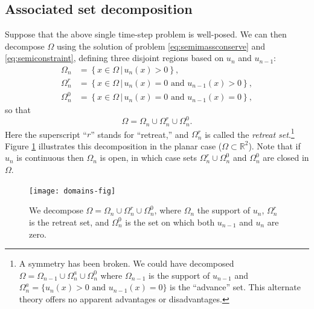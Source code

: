 \documentclass[final,leqno,onefignum,onetabnum]{siamltex1213bueler}
\newcommand\RR{\mathbb{R}}
\begin{document}
\subsection{Associated set decomposition}  \label{subsec:setdecompose}  Suppose that the above single time-step problem is well-posed.  We can then decompose $\Omega$ using the solution of problem \eqref{eq:semimassconserve} and \eqref{eq:semiconstraint}, defining three disjoint regions based on $u_n$ and $u_{n-1}$:
\begin{align*}
\Omega_n &= \left\{x \in \Omega \,\big|\, u_n(x)>0\right\}, \\
\Omega_n^r &= \left\{x \in \Omega \,\big|\, u_n(x)=0 \text{ and } u_{n-1}(x) > 0\right\}, \\
\Omega_n^0 &= \left\{x \in \Omega \,\big|\, u_n(x)=0 \text{ and } u_{n-1}(x) = 0\right\},
\end{align*}
so that
\begin{equation}
\Omega = \Omega_n \cup \Omega_n^r \cup \Omega_n^0.  \label{eq:omegadecomposition}
\end{equation}
Here the superscript ``$r$'' stands for ``retreat,'' and $\Omega_n^r$ is called the \emph{retreat set}.\footnote{A symmetry has been broken.  We could have decomposed $\Omega= \Omega_{n-1} \cup \Omega_n^a \cup \Omega_n^0$ where $\Omega_{n-1}$ is the support of $u_{n-1}$ and $\Omega_n^a = \{u_n(x) > 0 \text{ and } u_{n-1}(x) = 0\}$ is the ``advance'' set.  This alternate theory offers no apparent advantages or disadvantages.}  Figure \ref{fig:domains} illustrates this decomposition in the planar case ($\Omega \subset \RR^2$).  Note that if $u_n$ is continuous then $\Omega_n$ is open, in which case sets $\Omega_n^r \cup \Omega_n^0$ and $\Omega_n^0$ are closed in $\Omega$.

\begin{figure}[ht]
\medskip
\begin{center}
\texttt{[image: domains-fig]}
\end{center}
\caption{We decompose $\Omega = \Omega_n \cup \Omega_n^r \cup \Omega_n^0$, where $\Omega_n$ the support of $u_n$, $\Omega_n^r$ is the retreat set, and $\Omega_n^0$ is the set on which both $u_{n-1}$ and $u_n$ are zero.}
\label{fig:domains}
\end{figure}
\end{document}
